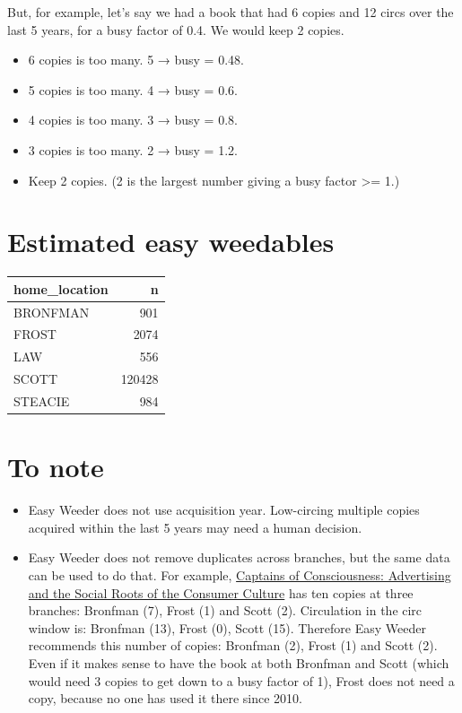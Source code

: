 \documentclass[11pt]{article}
\begin{document}
But, for example, let's say we had a book that had 6 copies and 12 circs over the last 5 years, for a busy factor of 0.4.  We would keep 2 copies.

\begin{itemize}
\item 6 copies is too many.  5 → busy = 0.48.
\item 5 copies is too many.  4 → busy = 0.6.
\item 4 copies is too many.  3 → busy = 0.8.
\item 3 copies is too many.  2 → busy = 1.2.
\item Keep 2 copies.  (2 is the largest number giving a busy factor >= 1.)
\end{itemize}

\section*{Estimated easy weedables}
\label{sec:org7d775b4}

\begin{center}
\begin{tabular}{lr}
home\_location & n\\
\hline
BRONFMAN & 901\\
FROST & 2074\\
LAW & 556\\
SCOTT & 120428\\
STEACIE & 984\\
\end{tabular}
\end{center}

\section*{To note}
\label{sec:orgf0b8552}

\begin{itemize}
\item Easy Weeder does not use acquisition year.  Low-circing multiple copies acquired within the last 5 years may need a human decision.
\item Easy Weeder does not remove duplicates across branches, but the same data can be used to do that. For example, \href{https://www.library.yorku.ca/find/Record/1172}{Captains of Consciousness: Advertising and the Social Roots of the Consumer Culture} has ten copies at three branches: Bronfman (7), Frost (1) and Scott (2).  Circulation in the circ window is: Bronfman (13), Frost (0), Scott (15).  Therefore Easy Weeder recommends this number of copies: Bronfman (2), Frost (1) and Scott (2).  Even if it makes sense to have the book at both Bronfman and Scott (which would need 3 copies to get down to a busy factor of 1), Frost does not need a copy, because no one has used it there since 2010.
\end{itemize}
\end{document}
